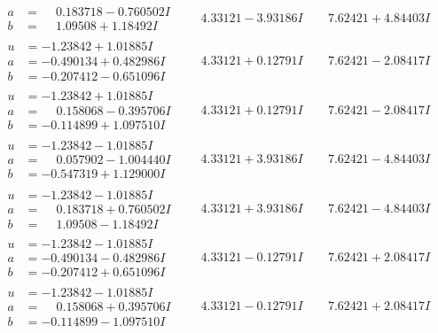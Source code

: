 \documentclass[1p]{elsarticle_modified}
\theoremstyle{definition}
\begin{document}
$$\begin{array}{c|c|c}
\begin{aligned}
a &= \phantom{-}0.183718 - 0.760502 I \\
b &= \phantom{-}1.09508 + 1.18492 I\end{aligned}
 & \phantom{-}4.33121 - 3.93186 I & \phantom{-}7.62421 + 4.84403 I \\ \hline\begin{aligned}
u &= -1.23842 + 1.01885 I \\
a &= -0.490134 + 0.482986 I \\
b &= -0.207412 - 0.651096 I\end{aligned}
 & \phantom{-}4.33121 + 0.12791 I & \phantom{-}7.62421 - 2.08417 I \\ \hline\begin{aligned}
u &= -1.23842 + 1.01885 I \\
a &= \phantom{-}0.158068 - 0.395706 I \\
b &= -0.114899 + 1.097510 I\end{aligned}
 & \phantom{-}4.33121 + 0.12791 I & \phantom{-}7.62421 - 2.08417 I \\ \hline\begin{aligned}
u &= -1.23842 - 1.01885 I \\
a &= \phantom{-}0.057902 - 1.004440 I \\
b &= -0.547319 + 1.129000 I\end{aligned}
 & \phantom{-}4.33121 + 3.93186 I & \phantom{-}7.62421 - 4.84403 I \\ \hline\begin{aligned}
u &= -1.23842 - 1.01885 I \\
a &= \phantom{-}0.183718 + 0.760502 I \\
b &= \phantom{-}1.09508 - 1.18492 I\end{aligned}
 & \phantom{-}4.33121 + 3.93186 I & \phantom{-}7.62421 - 4.84403 I \\ \hline\begin{aligned}
u &= -1.23842 - 1.01885 I \\
a &= -0.490134 - 0.482986 I \\
b &= -0.207412 + 0.651096 I\end{aligned}
 & \phantom{-}4.33121 - 0.12791 I & \phantom{-}7.62421 + 2.08417 I \\ \hline\begin{aligned}
u &= -1.23842 - 1.01885 I \\
a &= \phantom{-}0.158068 + 0.395706 I \\
b &= -0.114899 - 1.097510 I\end{aligned}
 & \phantom{-}4.33121 - 0.12791 I & \phantom{-}7.62421 + 2.08417 I \\ \hline\begin{aligned}

\end{aligned}
\end{array}$$
\end{document}
